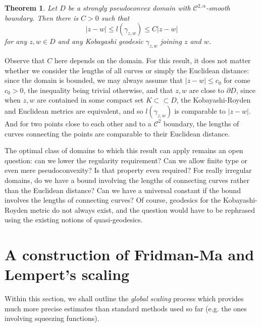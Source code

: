 \documentclass[a4paper,12pt]{amsart}
\newtheorem{theorem}{Theorem}
\theoremstyle{remark}\newtheorem{remark}[theorem]{Remark}
\begin{document}
	\begin{theorem}\label{thm:main}
Let $D$ be a strongly pseudoconvex domain with $\mathcal C^{2, \alpha}$-smooth boundary. Then there is $C>0$ such that $$|z-w|\leq l(\gamma_{z,w}) \leq C |z-w|$$
for any $z,w\in D$ and any Kobayashi geodesic $\gamma_{z,w}$ joining $z$ and $w$.
\end{theorem}

Observe that $C$ here depends on the domain. For this result, it does not matter whether
we consider the lengths of all curves or simply the Euclidean distance: since the
domain is bounded, we may always assume that $|z-w|\le c_0$ for come $c_0>0$,
the inequality being trivial otherwise, and that $z,w$ are close to $\partial D$,
since when $z,w$ are contained in some compact set $K\subset\subset D$, 
the Kobayashi-Royden and Euclidean metrics are equivalent, and so
$ l(\gamma_{z,w})$ is comparable to $|z-w|$. And for two points close to each other
and to a $\mathcal C^2$ boundary, the lengths of curves connecting the points are
comparable to their Euclidean distance.

The optimal class of domains to which this result can apply remains an open question: can we
lower the regularity requirement? Can we allow finite type or even 
mere pseudoconvexity? Is that property even required? 
For really irregular domains,
do we have a bound involving the lengths
of connecting curves rather than the Euclidean distance?
Can we have a universal constant if the bound involves the lengths
of connecting curves?
Of course, geodesics
for the Kobayashi-Royden metric do not always exist, 
and the question would have to be rephrased using the existing notions of quasi-geodesics.




\section{A construction of Fridman-Ma and Lempert's scaling}\label{sec:FM}

Within this section, we shall outline the \emph{global scaling} process which provides much more precise estimates than standard methods used so far (e.g. the ones involving squeezing functions).
\end{document}
